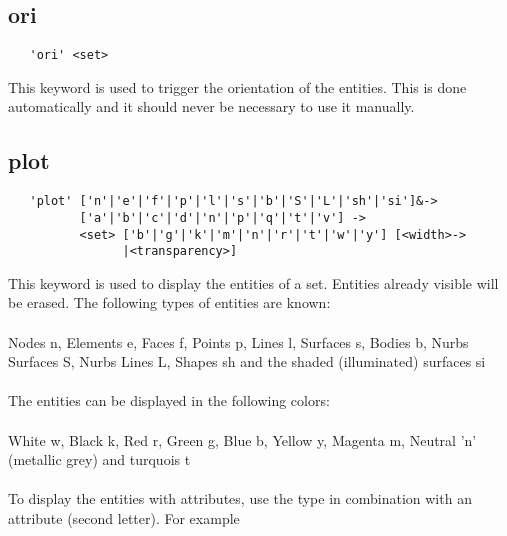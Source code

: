 \documentclass{article}
\begin{document}
\subsection{\label{ori}ori}
\begin{verbatim}
   'ori' <set> 
\end{verbatim}
This keyword is used to trigger the orientation of the entities. This is done automatically and it should never be necessary to use it manually.

\subsection{\label{plot}plot}
\begin{verbatim}
   'plot' ['n'|'e'|'f'|'p'|'l'|'s'|'b'|'S'|'L'|'sh'|'si']&->
          ['a'|'b'|'c'|'d'|'n'|'p'|'q'|'t'|'v'] ->
          <set> ['b'|'g'|'k'|'m'|'n'|'r'|'t'|'w'|'y'] [<width>->
                |<transparency>] 
\end{verbatim}
This keyword is used to display the entities of a set. Entities already visible will be erased. The following types of entities are known:\\\\
Nodes n, Elements e, Faces f, Points p, Lines l, Surfaces s, Bodies b, Nurbs Surfaces S, Nurbs Lines L, Shapes sh and the shaded (illuminated) surfaces si\\\\The entities can be displayed in the following colors:\\\\
White w, Black k, Red r, Green g, Blue b, Yellow y, Magenta m, Neutral 'n' (metallic grey) and turquois t\\\\ To display the entities with attributes, use the type in combination with an attribute (second letter). For example\\\\
\end{document}
